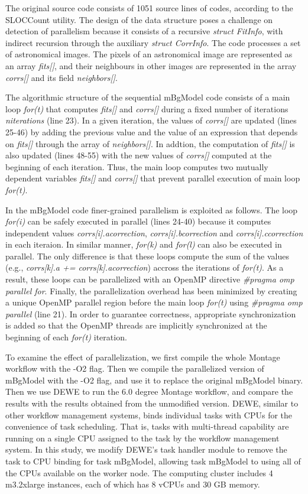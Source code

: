 The original source code consists of 1051 source lines of codes, according to the SLOCCount utility. The design of the data structure poses a challenge on detection of parallelism because it consists of a recursive {\em struct FitInfo}, with indirect recursion through the auxiliary {\em struct CorrInfo}. The code processes a set of astronomical images. The pixels of an astronomical image are represented as an array {\em fits[]}, and their neighbours in other images are represented in the array {\em corrs[]} and its field {\em neighbors[]}.

The algorithmic structure of the sequential mBgModel code consists of a main loop {\em for(t)} that computes {\em fits[]} and {\em corrs[]} during a fixed number of iterations {\em niterations} (line 23). In a given iteration, the values of {\em corrs[]} are updated (lines 25-46) by adding the previous value and the value of an expression that depends on {\em fits[]} through the array of {\em neighbors[]}. In addtion, the computation of {\em fits[]} is also updated (lines 48-55) with the new values of {\em corrs[]} computed at the beginning of each iteration. Thus, the main loop computes two mutually dependent variables {\em fits[]} and {\em corrs[]} that prevent parallel execution of  main loop {\em for(t)}.

In the mBgModel code finer-grained parallelism is exploited as follows. The loop {\em for(i)} can be safely executed in parallel (lines 24-40) because it computes independent values {\em corrs[i].acorrection}, {\em corrs[i].bcorrection} and {\em corrs[i].ccorrection} in each iteraion. In similar manner, {\em for(k)} and {\em for(l)} can also be executed in parallel. The only difference is that these loops compute the sum of the values (e.g., {\em corrs[k].a += corrs[k].acorrection}) accross the iterations of {\em for(t)}. As a result, these loops can be parallelized with an OpenMP directive {\em \#pragma omp parallel for}. Finally, the parallelization overhead has been minimized by creating a unique OpenMP parallel region before the main loop {\em for(t)} using {\em \#pragma omp parallel} (line 21). In order to guarantee correctness, appropriate synchronization is added so that the OpenMP threads are implicitly synchronized at the beginning of each {\em for(t)} iteration.

To examine the effect of parallelization, we first compile the whole Montage workflow with the -O2 flag. Then we compile the parallelized version of mBgModel with the -O2 flag, and use it to replace the original mBgModel binary. Then we use DEWE to run the 6.0 degree Montage workflow, and compare the results with the results obtained from the unmodified version. DEWE, similar to other workflow management systems, binds individual tasks with CPUs for the convenience of task scheduling. That is, tasks with multi-thread capability are running on a single CPU assigned to the task by the workflow management system. In this study, we modify DEWE's task handler module to remove the task to CPU binding for task mBgModel, allowing task mBgModel to using all of the CPUs available on the worker node. The computing cluster includes 4 m3.2xlarge instances, each of which has 8 vCPUs and 30 GB memory. 

